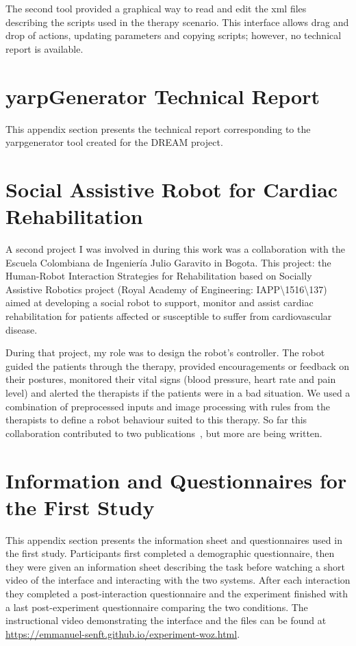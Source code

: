 The second tool provided a graphical way to read and edit the xml files describing the scripts used in the therapy scenario. This interface allows drag and drop of actions, updating parameters and copying scripts; however, no technical report is available.

\cleartooddpage
\chapter{yarpGenerator Technical Report} \label{app:yarpgenerator}
This appendix section presents the technical report corresponding to the yarpgenerator tool created for the DREAM project.

\cleartooddpage
\chapter{Social Assistive Robot for Cardiac Rehabilitation} \label{app:Colombia}

A  second project I was involved in during this work was a collaboration with the Escuela Colombiana de Ingeniería Julio Garavito in Bogota. This project:  the Human-Robot Interaction Strategies for Rehabilitation based on Socially Assistive Robotics project (Royal Academy of Engineering: IAPP\textbackslash1516\textbackslash137) aimed at developing a social robot to support, monitor and assist cardiac rehabilitation for patients affected or susceptible to suffer from cardiovascular disease.

During that project, my role was to design the robot's controller. The robot guided the patients through the therapy, provided encouragements or feedback on their postures, monitored their vital signs (blood pressure, heart rate and pain level) and alerted the therapists if the patients were in a bad situation. We used a combination of preprocessed inputs and image processing with rules from the therapists to define a robot behaviour suited to this therapy. So far this collaboration contributed to two publications~\citep{lara2017human,casas2018social}, but more are being written.

\cleartooddpage
\chapter{Information and Questionnaires for the First Study} \label{app:woz_questionnaires}
This appendix section presents the information sheet and questionnaires used in the first study. Participants first completed a demographic questionnaire, then they were given an information sheet describing the task before watching a short video of the interface and interacting with the two systems. After each interaction they completed a post-interaction questionnaire and the experiment finished with a last post-experiment questionnaire comparing the two conditions. The instructional video demonstrating the interface and the files can be found at  \url{https://emmanuel-senft.github.io/experiment-woz.html}.

